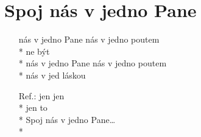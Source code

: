 \section{Spoj nás v jedno Pane}
\begin{enumerate}
\item[]  nás v jedno Pane  nás v jedno poutem \\*
 ne být  \\*
 nás v jedno Pane  nás v jedno poutem \\*
 nás v jed láskou  
\item[Ref.:]  jen    jen   \\*
 jen   to     \\*
Spoj nás v jedno Pane… \\*
\end{enumerate}
